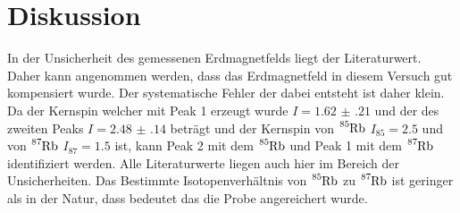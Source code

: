 \section{Diskussion}
\label{sec:Diskussion}
In der Unsicherheit des gemessenen Erdmagnetfelds liegt der Literaturwert. Daher kann angenommen werden, dass das Erdmagnetfeld
in diesem Versuch gut kompensiert wurde. Der systematische Fehler der dabei entsteht ist daher klein.
Da der Kernspin welcher mit Peak 1 erzeugt wurde $I=\num{1.62(21)}$ und der des zweiten Peaks $I=\num{2.48(14)}$ beträgt 
und der Kernspin von $\ce{^85Rb}$ $I_{85}=\num{2.5}$ und von $\ce{^87Rb}$ $I_{87}=\num{1.5}$ ist, kann Peak 2 mit 
dem $\ce{^85Rb}$ und Peak 1 mit dem $\ce{^87Rb}$ identifiziert werden. Alle Literaturwerte liegen auch hier im Bereich der Unsicherheiten.
Das Bestimmte Isotopenverhältnis von $\ce{^85Rb}$ zu $\ce{^87Rb}$ ist geringer als in der Natur, dass bedeutet das die Probe 
angereichert wurde.
